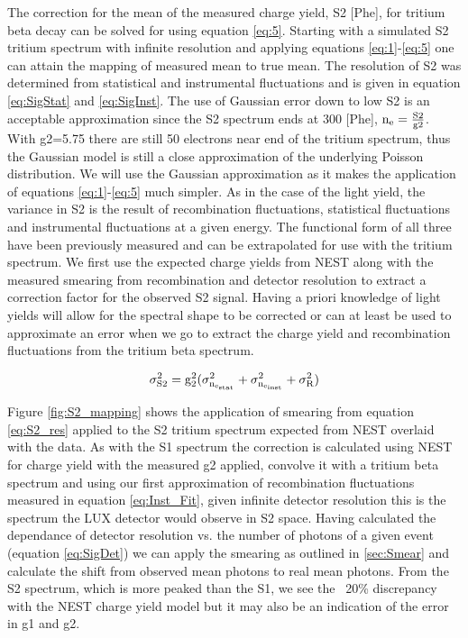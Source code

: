 The correction for the mean of the measured charge yield, S2 [Phe], for tritium beta decay can be solved for using equation \ref{eq:5}. Starting with a simulated S2 tritium spectrum with infinite resolution and applying equations \ref{eq:1}-\ref{eq:5} one can attain the mapping of measured mean to true mean.  The resolution of S2 was determined from statistical and  instrumental fluctuations and is given in equation \ref{eq:SigStat} and \ref{eq:SigInst}. The use of Gaussian error down to low S2 is an acceptable approximation since the S2 spectrum ends at 300 [Phe], $\rm n_e = \frac{S2}{g2}$. With g2=5.75 there are still 50 electrons near end of the tritium spectrum, thus the Gaussian model is still a close approximation of the underlying Poisson distribution. We will use the Gaussian approximation as it makes the application of equations \ref{eq:1}-\ref{eq:5} much simpler.
As in the case of the light yield, the variance in S2 is the result of recombination fluctuations, statistical fluctuations and instrumental fluctuations at a given energy. The functional form of all three have been previously measured and can be extrapolated for use with the tritium spectrum. We first use the expected charge yields from NEST along with the measured smearing from recombination and detector resolution to extract a correction factor for the observed S2 signal. Having a priori knowledge of light yields will allow for the spectral shape to be corrected or can at least be used to approximate an error when we go to extract the charge yield and recombination fluctuations  from the tritium beta spectrum.

\begin{equation}
 \rm \sigma_{S2}^2=g_2^2(\sigma_{n_{e_{stat}}}^2+\sigma_{n_{e_{inst}}}^2+\sigma_R^2)
\label{eq:S2_res}
\end{equation}


Figure \ref{fig:S2_mapping} shows the application of smearing from equation \ref{eq:S2_res} applied to the S2 tritium spectrum expected from NEST overlaid with the data. As with the S1 spectrum the correction is calculated using NEST for charge yield with the measured g2 applied, convolve it with a tritium beta spectrum and using our first approximation of recombination fluctuations measured in equation \ref{eq:Inst_Fit}, given infinite detector resolution this is the spectrum the LUX detector would observe in S2 space. Having calculated the dependance of detector resolution vs. the number of photons of a given event (equation \ref{eq:SigDet}) we can apply the smearing as outlined in \ref{sec:Smear} and calculate the shift from observed mean photons to real mean photons. From the S2 spectrum, which is more peaked than the S1, we see the ~20\% discrepancy with the NEST charge yield model but it may also be an indication of the error in g1 and g2.

